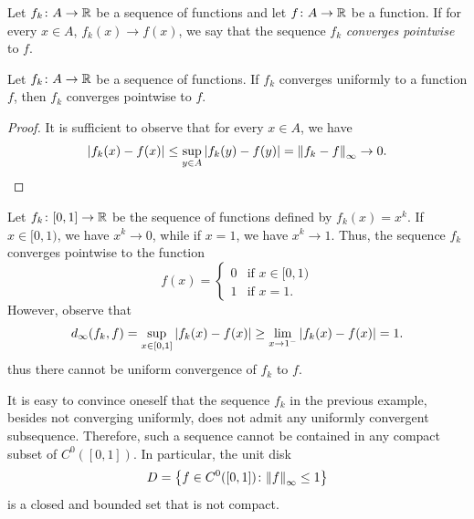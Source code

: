 \begin{definition}
\mymark{***}
Let $f_k\colon A \to {\mathbb R}$ be a sequence of functions
and let $f\colon A \to {\mathbb R}$ be a function.
If for every $x\in A$, $f_k(x)\to f(x)$, we say that
the sequence $f_k$
\emph{converges pointwise}
to $f$.
\end{definition}

\begin{theorem}
\mymark{***}
Let $f_k\colon A \to {\mathbb R}$ be a sequence of functions.
If $f_k$ converges uniformly to a function $f$, then $f_k$ converges pointwise
to $f$.
\end{theorem}
%
\begin{proof}
It is sufficient to observe that for every $x\in A$, we have
\[
  {\left|f_k(x)-f(x)\right|} \le \sup_{y\in A} {\left|f_k(y)-f(y)\right|}
   = {\left\Vert f_k-f\right\Vert}_\infty \to 0.
\]
\end{proof}

\begin{example}
\mymark{***}%
\label{ex:puntuale_non_uniforme}%
Let $f_k\colon [0,1]\to {\mathbb R}$ be the sequence of functions defined by
$f_k(x)=x^k$. If $x\in[0,1)$, we have $x^k \to 0$, while if $x=1$, we have $x^k
\to 1$.
Thus, the sequence $f_k$ converges pointwise to the function
\[
f(x) =
 \begin{cases}
  0 & \text{if $x\in [0,1)$}\\
  1 & \text{if $x=1$}.
 \end{cases}
\]
However, observe that
\[
  d_\infty(f_k,f) = \sup_{x\in [0,1]} {\left|f_k(x)-f(x)\right|}
  \ge \lim_{x\to 1^-} {\left|f_k(x) - f(x)\right|} = 1.
\]
thus there cannot be uniform convergence of $f_k$ to $f$.
\end{example}

It is easy to convince oneself that the sequence $f_k$ in the previous example,
besides not converging uniformly, does not admit any uniformly convergent
subsequence. Therefore, such a sequence cannot be contained in any compact
subset of $C^0([0,1])$. In particular, the unit disk
\[
  D = {\left\{ f\in C^0([0,1])\colon {\left\Vert f\right\Vert}_\infty \le 1 \right\}}
\]
is a closed and bounded set that is not compact.

